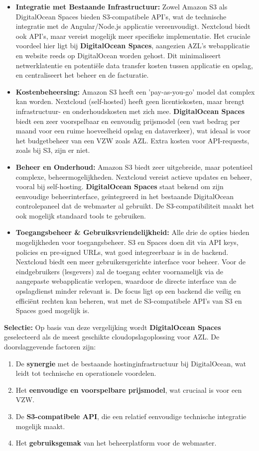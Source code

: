 \begin{itemize}
    \item \textbf{Integratie met Bestaande Infrastructuur:} Zowel Amazon S3 als DigitalOcean Spaces bieden S3-compatibele API's, wat de technische integratie met de Angular/Node.js applicatie vereenvoudigt. Nextcloud biedt ook API's, maar vereist mogelijk meer specifieke implementatie. Het cruciale voordeel hier ligt bij \textbf{DigitalOcean Spaces}, aangezien AZL's webapplicatie en website reeds op DigitalOcean worden gehost. Dit minimaliseert netwerklatentie en potentiële data transfer kosten tussen applicatie en opslag, en centraliseert het beheer en de facturatie.
    \item \textbf{Kostenbeheersing:} Amazon S3 heeft een 'pay-as-you-go' model dat complex kan worden. Nextcloud (self-hosted) heeft geen licentiekosten, maar brengt infrastructuur- en onderhoudskosten met zich mee. \textbf{DigitalOcean Spaces} biedt een zeer voorspelbaar en eenvoudig prijsmodel (een vast bedrag per maand voor een ruime hoeveelheid opslag en dataverkeer), wat ideaal is voor het budgetbeheer van een VZW zoals AZL. Extra kosten voor API-requests, zoals bij S3, zijn er niet.
    \item \textbf{Beheer en Onderhoud:} Amazon S3 biedt zeer uitgebreide, maar potentieel complexe, beheermogelijkheden. Nextcloud vereist actieve updates en beheer, vooral bij self-hosting. \textbf{DigitalOcean Spaces} staat bekend om zijn eenvoudige beheerinterface, geïntegreerd in het bestaande DigitalOcean controlepaneel dat de webmaster al gebruikt. De S3-compatibiliteit maakt het ook mogelijk standaard tools te gebruiken.
    \item \textbf{Toegangsbeheer \& Gebruiksvriendelijkheid:} Alle drie de opties bieden mogelijkheden voor toegangsbeheer. S3 en Spaces doen dit via API keys, policies en pre-signed URLs, wat goed integreerbaar is in de backend. Nextcloud biedt een meer gebruikersgerichte interface voor beheer. Voor de eindgebruikers (lesgevers) zal de toegang echter voornamelijk via de aangepaste webapplicatie verlopen, waardoor de directe interface van de opslagdienst minder relevant is. De focus ligt op een backend die veilig en efficiënt rechten kan beheren, wat met de S3-compatibele API's van S3 en Spaces goed mogelijk is.
\end{itemize}

\textbf{Selectie:}
Op basis van deze vergelijking wordt \textbf{DigitalOcean Spaces} geselecteerd als de meest geschikte cloudopslagoplossing voor AZL. De doorslaggevende factoren zijn:
\begin{enumerate}
    \item De \textbf{synergie} met de bestaande hostinginfrastructuur bij DigitalOcean, wat leidt tot technische en operationele voordelen.
    \item Het \textbf{eenvoudige en voorspelbare prijsmodel}, wat cruciaal is voor een VZW.
    \item De \textbf{S3-compatibele API}, die een relatief eenvoudige technische integratie mogelijk maakt.
    \item Het \textbf{gebruiksgemak} van het beheerplatform voor de webmaster.
\end{enumerate}

